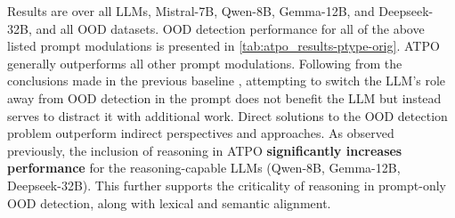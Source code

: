 Results are over all LLMs, Mistral-7B, Qwen-8B, Gemma-12B, and Deepseek-32B, and all OOD datasets. OOD detection performance for all of the above listed prompt modulations is presented in \ref{tab:atpo_results-ptype-orig}. ATPO generally outperforms all other prompt modulations. Following from the conclusions made in the previous baseline \cite{wang2024beyond}, attempting to switch the LLM's role away from OOD detection in the prompt does not benefit the LLM but instead serves to distract it with additional work. Direct solutions to the OOD detection problem outperform indirect perspectives and approaches.
As observed previously, the inclusion of reasoning in ATPO \textbf{significantly increases performance} for the reasoning-capable LLMs (Qwen-8B, Gemma-12B, Deepseek-32B). This further supports the criticality of reasoning in prompt-only OOD detection, along with lexical and semantic alignment. %


